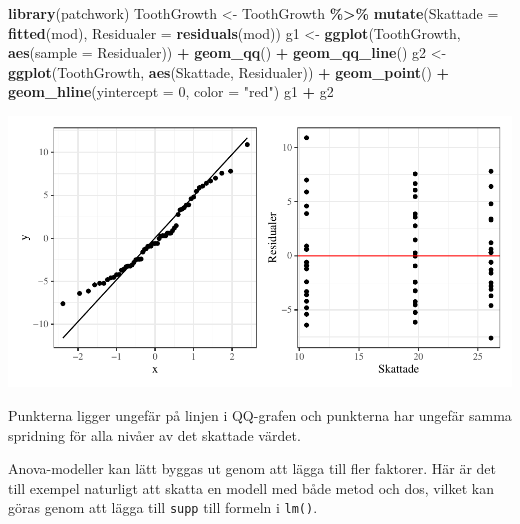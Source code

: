 \documentclass[
]{book}
\newenvironment{Shaded}{\begin{snugshade}}{\end{snugshade}}
\newcommand{\AttributeTok}[1]{\textcolor[rgb]{0.13,0.29,0.53}{#1}}
\newcommand{\DecValTok}[1]{\textcolor[rgb]{0.00,0.00,0.81}{#1}}
\newcommand{\FunctionTok}[1]{\textcolor[rgb]{0.13,0.29,0.53}{\textbf{#1}}}
\newcommand{\NormalTok}[1]{#1}
\newcommand{\OtherTok}[1]{\textcolor[rgb]{0.56,0.35,0.01}{#1}}
\newcommand{\SpecialCharTok}[1]{\textcolor[rgb]{0.81,0.36,0.00}{\textbf{#1}}}
\newcommand{\StringTok}[1]{\textcolor[rgb]{0.31,0.60,0.02}{#1}}
\theoremstyle{definition}
\theoremstyle{definition}
\theoremstyle{definition}
\theoremstyle{definition}
\theoremstyle{remark}
\begin{document}
\begin{Shaded}
\begin{Highlighting}[]
\FunctionTok{library}\NormalTok{(patchwork)}
\NormalTok{ToothGrowth }\OtherTok{\textless{}{-}}\NormalTok{ ToothGrowth }\SpecialCharTok{\%\textgreater{}\%} 
  \FunctionTok{mutate}\NormalTok{(}\AttributeTok{Skattade =} \FunctionTok{fitted}\NormalTok{(mod),}
         \AttributeTok{Residualer =} \FunctionTok{residuals}\NormalTok{(mod))}
\NormalTok{g1 }\OtherTok{\textless{}{-}} \FunctionTok{ggplot}\NormalTok{(ToothGrowth, }\FunctionTok{aes}\NormalTok{(}\AttributeTok{sample =}\NormalTok{ Residualer)) }\SpecialCharTok{+} \FunctionTok{geom\_qq}\NormalTok{() }\SpecialCharTok{+} \FunctionTok{geom\_qq\_line}\NormalTok{()}
\NormalTok{g2 }\OtherTok{\textless{}{-}} \FunctionTok{ggplot}\NormalTok{(ToothGrowth, }\FunctionTok{aes}\NormalTok{(Skattade, Residualer)) }\SpecialCharTok{+}
  \FunctionTok{geom\_point}\NormalTok{() }\SpecialCharTok{+}
  \FunctionTok{geom\_hline}\NormalTok{(}\AttributeTok{yintercept =} \DecValTok{0}\NormalTok{, }\AttributeTok{color =} \StringTok{"red"}\NormalTok{)}
\NormalTok{g1 }\SpecialCharTok{+}\NormalTok{ g2}
\end{Highlighting}
\end{Shaded}

\begin{center}\includegraphics{R-anvisningar_files/figure-latex/unnamed-chunk-262-1} \end{center}

Punkterna ligger ungefär på linjen i QQ-grafen och punkterna har ungefär samma spridning för alla nivåer av det skattade värdet.

Anova-modeller kan lätt byggas ut genom att lägga till fler faktorer. Här är det till exempel naturligt att skatta en modell med både metod och dos, vilket kan göras genom att lägga till \texttt{supp} till formeln i \texttt{lm()}.
\end{document}
